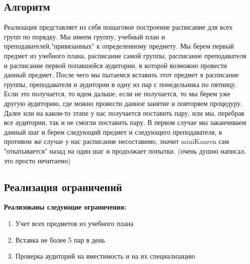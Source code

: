 


\subsection{Алгоритм}
Реализация представляет из себя пошаговое построение расписание для всех групп по порядку. Мы имеем группу, учебный план и преподавателей,"привязанных" к определенному предмету. Мы берем первый предмет из учебного плана, расписание самой группы, расписание преподавателя и расписание первой попавшейся аудитории, в которой возможно провести данный предмет. После чего мы пытаемся вставить этот предмет в расписание группы, преподавателя и аудитории в одну из пар с понедельника по пятницу. Если это получается, то идем дальше, если не получается, то мы берем уже другую аудиторию, где можно провести данное занятие и повторяем процедуру. Далее или на каком-то этапе у нас получается поставить пару, или мы, перебрав все аудитории, так и не смогли поставить пару. В первом случае мы заканчиваем данный шаг и берем следующий предмет и следующего преподавателя, в противом же случае у нас расписание несоставимо, значит miniKanren сам "откатывается" назад на один шаг и продолжает попытки.                            (очень душно написал, это просто нечитаемо)                       
\subsection{Реализация ограничений}
\textbf{Реализованы следующие ограничения:}
\begin{enumerate}
    \item Учет всех предметов из учебного плана
    \item Вставка не более 5 пар в день
    \item Проверка аудиторий на вместимость и на их специализацию
\end{enumerate}

